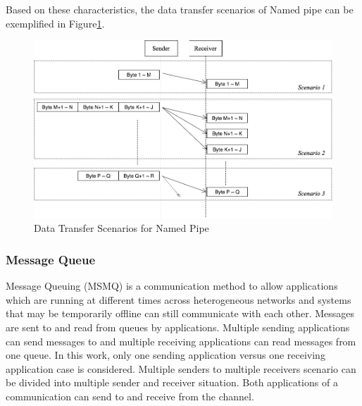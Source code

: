 Based on these characteristics, the data transfer scenarios of Named pipe can be exemplified in Figure\ref{namedpipe}. 
\begin{figure}[H]
\centerline{\includegraphics[scale=0.48]{Figures/namedpipe}}
\caption{Data Transfer Scenarios for Named Pipe}
\label{namedpipe}
\end{figure}

\subsubsection{Message Queue}
Message Queuing (MSMQ) is a communication method to allow applications which are running at different times across heterogeneous networks and systems that may be temporarily offline can still communicate with each other. Messages are sent to and read from queues by applications. Multiple sending applications can send messages to and multiple receiving applications can read messages from one queue.\cite{redkar2004pro} In this work, only one sending application versus one receiving application case is considered. Multiple senders to multiple receivers scenario can be divided into multiple sender and receiver situation. Both applications of a communication can send to and receive from the channel.

